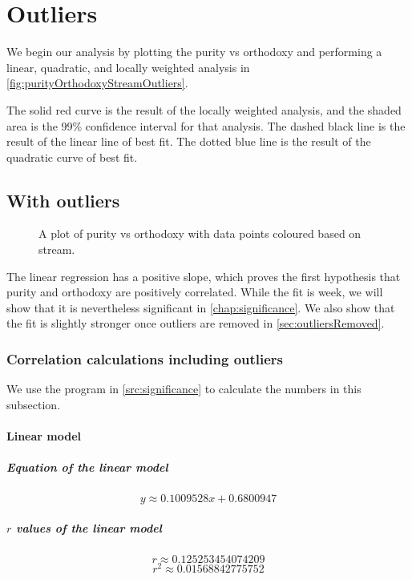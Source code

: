 \chapter{Outliers}\label{chap:outliers}

We begin our analysis by plotting the purity vs orthodoxy and performing a linear, quadratic, and locally weighted analysis in \vref{fig:purityOrthodoxyStreamOutliers}.

The solid red curve is the result of the locally weighted analysis, and the shaded area is the 99\% confidence interval for that analysis.
The dashed black line is the result of the linear line of best fit.
The dotted blue line is the result of the quadratic curve of best fit.

\section{With outliers}
\begin{figure}[H]
	\caption{A plot of purity vs orthodoxy with data points coloured based on stream.}
	\label{fig:purityOrthodoxyStreamOutliers}
\end{figure}

The linear regression has a positive slope, which proves the first hypothesis that purity and orthodoxy are positively correlated.
While the fit is week, we will show that it is nevertheless significant in \vref{chap:significance}.
We also show that the fit is slightly stronger once outliers are removed in \vref{sec:outliersRemoved}.

\subsection{Correlation calculations including outliers}
We use the program in \vref{src:significance} to calculate the numbers in this subsection.

\subsubsection{Linear model}
\paragraph{Equation of the linear model}
\[y \approx \num{0.1009528}x + \num{0.6800947}\]
\paragraph{$r$ values of the linear model}
\[r \approx \num{0.125253454074209}\]
\[r^2 \approx \num{0.01568842775752}\]

